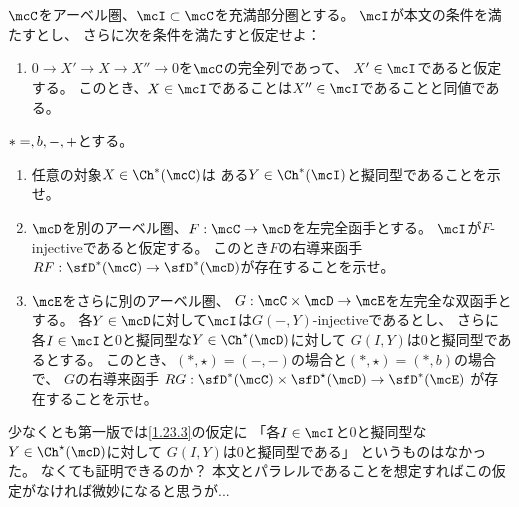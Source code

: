 \documentclass[uplatex,dvipdfmx]{jsarticle}
\begin{document}
\maketitle\HeaderCommentA
\section{}
\fi


\begin{prob}\label{1.23}
  \(\mcC\)をアーベル圏、\(\mcI\subset \mcC\)を充満部分圏とする。
  \(\mcI\)が本文の条件\cite[(1.7.5),(1.7.6)]{kashiwara2002sheaves}を満たすとし、
  さらに次を条件を満たすと仮定せよ：
  \begin{enumerate}[label=(\fnsymbol*),start=2]
    \item \label{1.23.c}
    \(0\to X'\to X\to X''\to 0\)を\(\mcC\)の完全列であって、
    \(X'\in \mcI\)であると仮定する。
    このとき、\(X\in \mcI\)であることは\(X''\in \mcI\)であることと同値である。
  \end{enumerate}
  \(*=\empty,b,-,+\)とする。
  \begin{enumerate}
    \item \label{1.23.1}
    任意の対象\(X\in \Ch^*(\mcC)\)は
    ある\(Y\in \Ch^*(\mcI)\)と擬同型であることを示せ。
    \item \label{1.23.2}
    \(\mcD\)を別のアーベル圏、\(F:\mcC\to \mcD\)を左完全函手とする。
    \(\mcI\)が\(F\)-injectiveであると仮定する。
    このとき\(F\)の右導来函手\(RF:\sfD^*(\mcC)\to \sfD^*(\mcD)\)が存在することを示せ。
    \item \label{1.23.3}
    \(\mcE\)をさらに別のアーベル圏、
    \(G:\mcC\times \mcD \to \mcE\)を左完全な双函手とする。
    各\(Y\in \mcD\)に対して\(\mcI\)は\(G(-,Y)\)-injectiveであるとし、
    さらに各\(I\in \mcI\)と\(0\)と擬同型な\(Y\in \Ch^{\star}(\mcD)\)に対して
    \(G(I,Y)\)は\(0\)と擬同型であるとする。
    このとき、\((*,\star) = (-,-)\)の場合と\((*,\star) = (*,b)\)の場合で、
    \(G\)の右導来函手
    \(RG:\sfD^*(\mcC)\times \sfD^{\star}(\mcD) \to \sfD^*(\mcE)\)
    が存在することを示せ。
  \end{enumerate}
\end{prob}

\begin{rem*}
  少なくとも第一版では\ref{1.23.3}の仮定に
  「各\(I\in \mcI\)と\(0\)と擬同型な\(Y\in \Ch^{\star}(\mcD)\)に対して
  \(G(I,Y)\)は\(0\)と擬同型である」
  というものはなかった。
  なくても証明できるのか？
  本文\cite[Corollary 1.10.5]{kashiwara2002sheaves}とパラレルであることを想定すればこの仮定がなければ微妙になると思うが...
\end{rem*}
\end{document}

